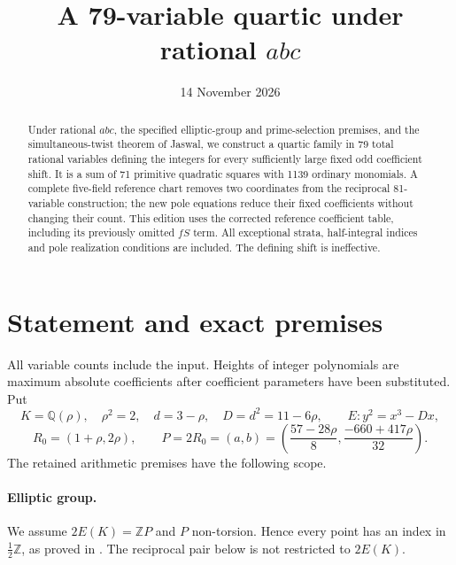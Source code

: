 \documentclass[11pt,a4paper]{article}
\title{A 79-variable quartic under rational $abc$}
\author{}\date{14 November 2026}
\newcommand{\Q}{\mathbb Q}\newcommand{\Z}{\mathbb Z}\DeclareMathOperator{\Tr}{Tr}\DeclareMathOperator{\Nm}{Nm}\DeclareMathOperator{\rad}{rad}
\begin{document}
\maketitle
\begin{abstract}
Under rational $abc$, the specified elliptic-group and prime-selection
premises, and the simultaneous-twist theorem of Jaswal, we construct a
quartic family in 79 total rational variables defining the integers for
every sufficiently large fixed odd coefficient shift. It is a sum of 71
primitive quadratic squares with 1139 ordinary monomials. A complete
five-field reference chart removes two coordinates from the reciprocal
81-variable construction; the new pole equations reduce their fixed
coefficients without changing their count. This edition uses the
corrected reference coefficient table, including its previously omitted
$fS$ term. All exceptional strata, half-integral indices and pole
realization conditions are included. The defining shift is ineffective.
\end{abstract}

\section{Statement and exact premises}
All variable counts include the input. Heights of integer polynomials
are maximum absolute coefficients after coefficient parameters have
been substituted. Put
\[
 K=\Q(\rho),\quad\rho^2=2,\quad d=3-\rho,\quad D=d^2=11-6\rho,
 \qquad E:y^2=x^3-Dx,
\]
\[
 R_0=(1+\rho,2\rho),\qquad
 P=2R_0=(a,b)=\left(\frac{57-28\rho}{8},\frac{-660+417\rho}{32}\right).
\]
The retained arithmetic premises have the following scope.

\paragraph{Elliptic group.}
We assume $2E(K)=\Z P$ and $P$ non-torsion. Hence every point has
an index in $\frac12\Z$, as proved in \cite[Corollary 1.3]{TraceAll}.
The reciprocal pair below is not restricted to $2E(K)$.
\end{document}
